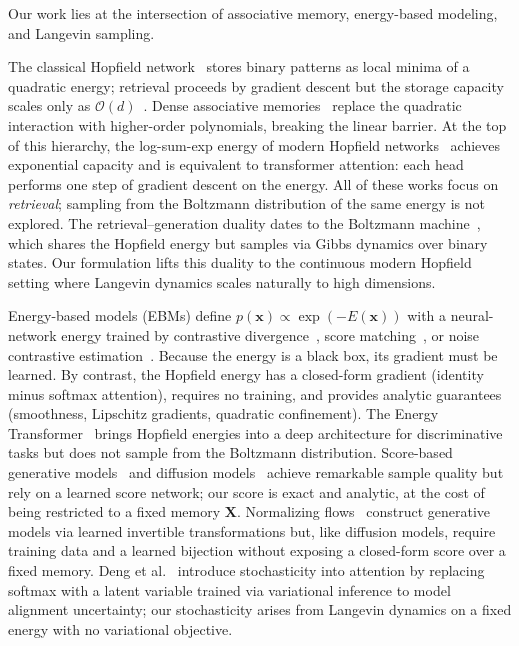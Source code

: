 
Our work lies at the intersection of associative memory, energy-based modeling, and Langevin sampling.

The classical Hopfield network~\cite{hopfieldNeuralNetworksPhysical1982} stores binary patterns as local minima of a quadratic energy; retrieval proceeds by gradient descent but the storage capacity scales only as $\mathcal{O}(d)$~\cite{amitStoringInfiniteNumbers1985}. Dense associative memories~\cite{krotovDenseAssociativeMemory2016,krotovLargeAssociativeMemory2021} replace the quadratic interaction with higher-order polynomials, breaking the linear barrier. At the top of this hierarchy, the log-sum-exp energy of modern Hopfield networks~\cite{ramsauerHopfieldNetworksAll2021} achieves exponential capacity and is equivalent to transformer attention: each head performs one step of gradient descent on the energy. All of these works focus on \emph{retrieval}; sampling from the Boltzmann distribution of the same energy is not explored. The retrieval--generation duality dates to the Boltzmann machine~\cite{ackeleyLearningAlgorithmBoltzmann1985}, which shares the Hopfield energy but samples via Gibbs dynamics over binary states. Our formulation lifts this duality to the continuous modern Hopfield setting where Langevin dynamics scales naturally to high dimensions.

Energy-based models (EBMs) define $p(\mathbf{x})\propto\exp(-E(\mathbf{x}))$ with a neural-network energy trained by contrastive divergence~\cite{hintonTrainingProductsExperts2002}, score matching~\cite{hyvarinen2005estimation}, or noise contrastive estimation~\cite{gutmannHyvaerinenNoiseContrastive2010,songHowTrainEnergyBased2021}. Because the energy is a black box, its gradient must be learned. By contrast, the Hopfield energy has a closed-form gradient (identity minus softmax attention), requires no training, and provides analytic guarantees (smoothness, Lipschitz gradients, quadratic confinement). The Energy Transformer~\cite{hooverEnergyTransformer2024} brings Hopfield energies into a deep architecture for discriminative tasks but does not sample from the Boltzmann distribution. Score-based generative models~\cite{songGenerativeModelingEstimating2019,songScoreBasedGenerativeModeling2021} and diffusion models~\cite{hoDenoisingDiffusionProbabilistic2020,sohlDicksteinDeepUnsupervisedLearning2015} achieve remarkable sample quality but rely on a learned score network; our score is exact and analytic, at the cost of being restricted to a fixed memory $\mathbf{X}$. Normalizing flows~\cite{rezendeMohamed2015} construct generative models via learned invertible transformations but, like diffusion models, require training data and a learned bijection without exposing a closed-form score over a fixed memory. Deng et al.~\cite{dengLatentAlignment2018} introduce stochasticity into attention by replacing softmax with a latent variable trained via variational inference to model alignment uncertainty; our stochasticity arises from Langevin dynamics on a fixed energy with no variational objective.
